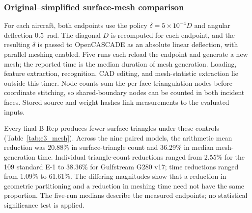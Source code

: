 \documentclass[12pt,a4paper]{article}
\begin{document}
\subsubsection{Original--simplified surface-mesh comparison}\label{sec:e3_results}

For each aircraft, both endpoints use the policy $\delta=5\times10^{-4}D$ and angular deflection 0.5~rad. The diagonal $D$ is recomputed for each endpoint, and the resulting $\delta$ is passed to OpenCASCADE as an absolute linear deflection, with parallel meshing enabled. Five runs each reload the endpoint and generate a new mesh; the reported time is the median duration of mesh generation. Loading, feature extraction, recognition, CAD editing, and mesh-statistic extraction lie outside this timer. Node counts sum the per-face triangulation nodes before coordinate stitching, so shared-boundary nodes can be counted in both incident faces. Stored source and weight hashes link measurements to the evaluated inputs.

Every final B-Rep produces fewer surface triangles under these controls (Table~\ref{tab:e3_mesh}). Across the nine paired models, the arithmetic mean reduction was 20.88\% in surface-triangle count and 36.29\% in median mesh-generation time. Individual triangle-count reductions ranged from 2.55\% for the 109 standard E-1 to 38.36\% for Gulfstream G280 v17; time reductions ranged from 1.09\% to 61.61\%. The differing magnitudes show that a reduction in geometric partitioning and a reduction in meshing time need not have the same proportion. The five-run medians describe the measured endpoints; no statistical significance test is applied.
\end{document}
